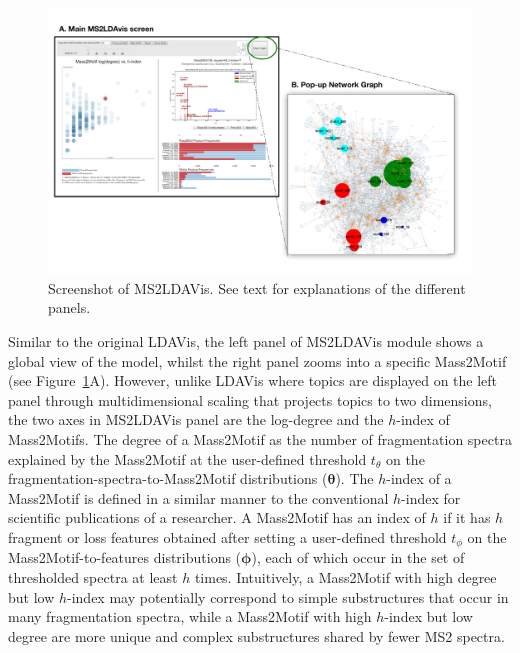 \begin{figure}[!htbp]
\centering\includegraphics[width=1.0\linewidth]{07-lda/figures/figure_s3.pdf}
\centering\caption{Screenshot of MS2LDAVis. See text for explanations of the different panels.\label{fig:m2ldavis-main}}
\end{figure}

Similar to the original LDAVis, the left panel of MS2LDAVis module shows a global view of the model, whilst the right panel zooms into a specific Mass2Motif (see Figure~\ref{fig:m2ldavis-main}A). However, unlike LDAVis where topics are displayed on the left panel through multidimensional scaling that projects topics to two dimensions, the two axes in MS2LDAVis panel are the log-degree and the $h$-index of Mass2Motifs. The degree of a Mass2Motif as the number of fragmentation spectra explained by the Mass2Motif at the user-defined threshold $t_{\theta}$ on the fragmentation-spectra-to-Mass2Motif distributions ($\boldsymbol{\theta}$). The $h$-index of a Mass2Motif is defined in a similar manner to the conventional $h$-index for scientific publications of a researcher. A Mass2Motif has an index of $h$ if it has $h$ fragment or loss features obtained after setting a user-defined threshold $t_{\phi}$ on the Mass2Motif-to-features distributions ($\boldsymbol{\phi}$), each of which occur in the set of thresholded spectra at least $h$ times. Intuitively, a Mass2Motif with high degree but low $h$-index may potentially correspond to simple substructures that occur in many fragmentation spectra, while a Mass2Motif with high $h$-index but low degree are more unique and complex substructures shared by fewer MS2 spectra.

